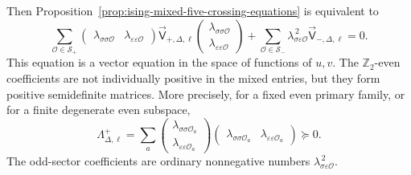 Then Proposition~\ref{prop:ising-mixed-five-crossing-equations} is equivalent
to
\begin{equation}
  \sum_{\mathcal O\in\mathcal S_+}
  \begin{pmatrix}
    \lambda_{\sigma\sigma\mathcal O} &
    \lambda_{\varepsilon\varepsilon\mathcal O}
  \end{pmatrix}
  \vec{\mathsf V}_{+,\Delta,\ell}
  \begin{pmatrix}
    \lambda_{\sigma\sigma\mathcal O}\\
    \lambda_{\varepsilon\varepsilon\mathcal O}
  \end{pmatrix}
  +
  \sum_{\mathcal O\in\mathcal S_-}
  \lambda_{\sigma\varepsilon\mathcal O}^{\,2}
  \vec{\mathsf V}_{-,\Delta,\ell}
  =
  0.
  \label{eq:ising-mixed-vector-crossing}
\end{equation}
This equation is a vector equation in the space of functions of \(u,v\).
The \(\mathbb Z_2\)-even coefficients are not individually positive in the
mixed entries, but they form positive semidefinite matrices.  More precisely,
for a fixed even primary family, or for a finite degenerate even subspace,
\begin{equation}
  \Lambda^+_{\Delta,\ell}
  =
  \sum_a
  \begin{pmatrix}
    \lambda_{\sigma\sigma\mathcal O_a}\\
    \lambda_{\varepsilon\varepsilon\mathcal O_a}
  \end{pmatrix}
  \begin{pmatrix}
    \lambda_{\sigma\sigma\mathcal O_a} &
    \lambda_{\varepsilon\varepsilon\mathcal O_a}
  \end{pmatrix}
  \succeq0.
  \label{eq:ising-even-ope-psd-matrix}
\end{equation}
The odd-sector coefficients are ordinary nonnegative numbers
\(\lambda_{\sigma\varepsilon\mathcal O}^{\,2}\).

